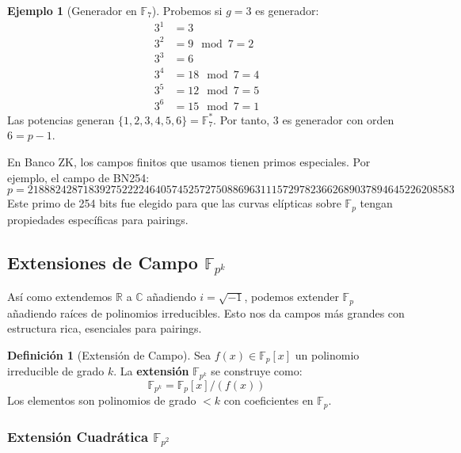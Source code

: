 \documentclass[11pt,a4paper,twoside,openright]{book}
\theoremstyle{definition}
\newtheorem{definition}{Definición}[chapter]
\newtheorem{example}{Ejemplo}[chapter]
\theoremstyle{plain}
\theoremstyle{remark}
\begin{document}
\begin{example}[Generador en $\mathbb{F}_7$]
Probemos si $g = 3$ es generador:
\begin{align*}
    3^1 &= 3 \\
    3^2 &= 9 \mod 7 = 2 \\
    3^3 &= 6 \\
    3^4 &= 18 \mod 7 = 4 \\
    3^5 &= 12 \mod 7 = 5 \\
    3^6 &= 15 \mod 7 = 1
\end{align*}
Las potencias generan $\{1, 2, 3, 4, 5, 6\} = \mathbb{F}_7^*$. Por tanto, $3$ es generador con orden $6 = p-1$.
\end{example}

\begin{bancozk}
En Banco ZK, los campos finitos que usamos tienen primos especiales. Por ejemplo, el campo de BN254:
\[ p = 21888242871839275222246405745257275088696311157297823662689037894645226208583 \]
Este primo de 254 bits fue elegido para que las curvas elípticas sobre $\mathbb{F}_p$ tengan propiedades específicas para pairings.
\end{bancozk}

\subsection{Extensiones de Campo $\mathbb{F}_{p^k}$}

\begin{intuicion}
Así como extendemos $\mathbb{R}$ a $\mathbb{C}$ añadiendo $i = \sqrt{-1}$, podemos extender $\mathbb{F}_p$ añadiendo raíces de polinomios irreducibles. Esto nos da campos más grandes con estructura rica, esenciales para pairings.
\end{intuicion}

\begin{definition}[Extensión de Campo]
Sea $f(x) \in \mathbb{F}_p[x]$ un polinomio irreducible de grado $k$. La \textbf{extensión} $\mathbb{F}_{p^k}$ se construye como:
\[ \mathbb{F}_{p^k} = \mathbb{F}_p[x] / (f(x)) \]
Los elementos son polinomios de grado $< k$ con coeficientes en $\mathbb{F}_p$.
\end{definition}

\subsubsection{Extensión Cuadrática $\mathbb{F}_{p^2}$}
\end{document}
